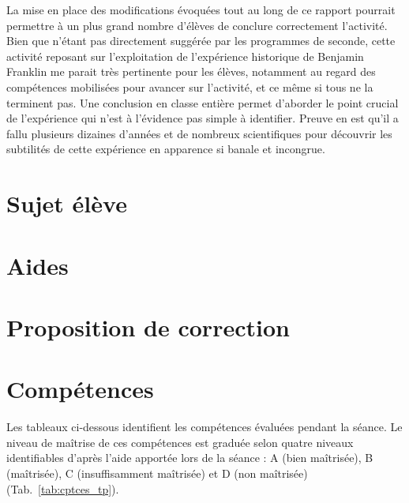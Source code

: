 \documentclass[12pt,a4paper, fleqn]{article}
\begin{document}
La mise en place des modifications évoquées tout au long de ce rapport pourrait permettre à un plus grand nombre d'élèves de conclure correctement l'activité.
Bien que n'étant pas directement suggérée par les programmes de seconde, cette activité reposant sur l'exploitation de l'expérience historique de Benjamin Franklin me parait très pertinente pour les élèves, notamment au regard des compétences mobilisées pour avancer sur l'activité, et ce même si tous ne la terminent pas.
Une conclusion en classe entière permet d'aborder le point crucial de l'expérience qui n'est à l'évidence pas simple à identifier.
Preuve en est qu'il a fallu plusieurs dizaines d'années et de nombreux scientifiques pour découvrir les subtilités de cette expérience en apparence si banale et incongrue.

\newpage


\newpage
\appendix

\section{Sujet élève}
\label{ann:sujet}



\section{Aides}
\label{ann:aides}



\section{Proposition de correction}
\label{ann:corr}



\section{Compétences}
\label{ann:cptces}

Les tableaux ci-dessous identifient les compétences évaluées pendant la séance.
Le niveau de maîtrise de ces compétences est graduée selon quatre niveaux identifiables d'après l'aide apportée lors de la séance : A (bien maîtrisée), B (maîtrisée), C (insuffisamment maîtrisée) et D (non maîtrisée) (Tab.~\ref{tab:cptces_tp}).
\end{document}
